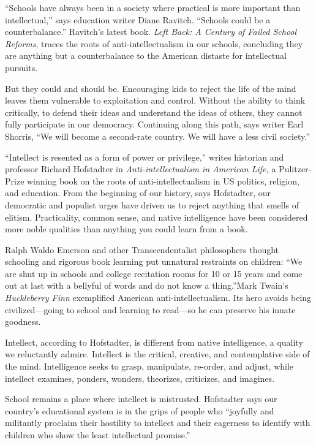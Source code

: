 ``Schools have always been in a society where practical is more
important than intellectual,'' says education writer Diane Ravitch.
``Schools could be a counterbalance.'' Ravitch's latest book. \emph{Left
	Back: A Century of Failed School Reforms}, traces the roots of
anti-intellectualism in our schools, concluding they are anything but a
counterbalance to the American distaste for intellectual pursuits.

But they could and should be. Encouraging kids to reject the life of the
mind leaves them vulnerable to exploitation and control. Without the
ability to think critically, to defend their ideas and understand the
ideas of others, they cannot fully participate in our democracy.
Continuing along this path, says writer Earl Shorris, ``We will become a
second-rate country. We will have a less civil society.''

``Intellect is resented as a form of power or privilege,'' writes
historian and professor Richard Hofstadter in \emph{Anti-intellectualism
	in American Life,} a Pulitzer-Prize winning book on the roots of
anti-intellectualism in US politics, religion, and education. From the
beginning of our history, says Hofstadter, our democratic and populist
urges have driven us to reject anything that smells of elitism.
Practicality, common sense, and native intelligence have been considered
more noble qualities than anything you could learn from a book.

Ralph Waldo Emerson and other Transcendentalist philosophers thought
schooling and rigorous book learning put unnatural restraints on
children: ``We are shut up in schools and college recitation rooms for
10 or 15 years and come out at last with a bellyful of words and do not
know a thing.''Mark Twain's \emph{Huckleberry Finn} exemplified American
anti-intellectualism. Its hero avoids being civilized---going to school
and learning to read---so he can preserve his innate goodness.

Intellect, according to Hofstadter, is different from native
intelligence, a quality we reluctantly admire. Intellect is the
critical, creative, and contemplative side of the mind. Intelligence
seeks to grasp, manipulate, re-order, and adjust, while intellect
examines, ponders, wonders, theorizes, criticizes, and imagines.

School remains a place where intellect is mistrusted. Hofstadter says
our country's educational system is in the grips of people who
``joyfully and militantly proclaim their hostility to intellect and
their eagerness to identify with children who show the least
intellectual promise.''


